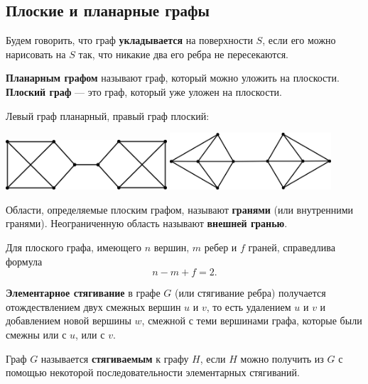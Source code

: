 \subsection{Плоские и планарные графы}

Будем говорить, что граф \textbf{укладывается} на поверхности \(S\), если его можно нарисовать на \(S\) так, что никакие два его ребра не пересекаются.

\textbf{Планарным графом} называют граф, который можно уложить на плоскости. \textbf{Плоский граф} --- это граф, который уже уложен на плоскости.

\begin{example*}
    Левый граф планарный, правый граф плоский:
    \begin{multicols}{2}
        \centering
        \null \vfill
        \includegraphics[width=0.45\textwidth]{images/planar-graph.png}
        \vfill \null
        \columnbreak
        \centering
        \null \vfill
        \includegraphics[width=0.45\textwidth]{images/plane-graph.png}
        \vfill \null
    \end{multicols}
\end{example*}

Области, определяемые плоским графом, называют \textbf{гранями} (или внутренними гранями). Неограниченную область называют \textbf{внешней гранью}.

\begin{theorem*}
    Для плоского графа, имеющего \(n\) вершин, \(m\) ребер и \(f\) граней, справедлива формула
    \[
        n - m + f = 2.
    \]
\end{theorem*}

\textbf{Элементарное стягивание} в графе \(G\) (или стягивание ребра) получается отождествлением двух смежных вершин \(u\) и \(v\), то есть удалением \(u\) и \(v\) и добавлением новой вершины \(w\), смежной с теми вершинами графа, которые были смежны или с \(u\), или с \(v\).

Граф \(G\) называется \textbf{стягиваемым} к графу \(H\), если \(H\) можно получить из \(G\) с помощью некоторой последовательности элементарных стягиваний.

